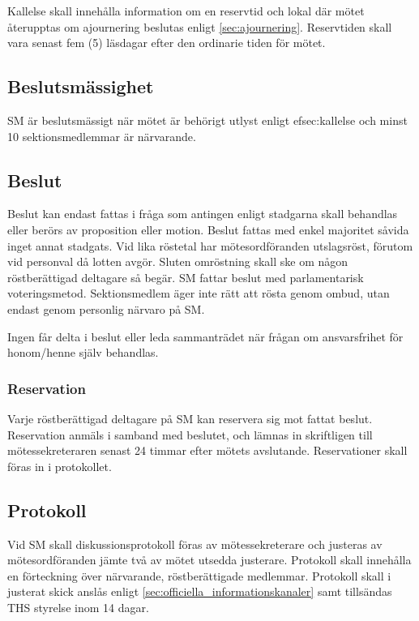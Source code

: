 \documentclass[a4paper,12pt]{article}
\begin{document}
Kallelse skall innehålla information om en reservtid och lokal där mötet återupptas om ajournering beslutas enligt \ref{sec:ajournering}. Reservtiden skall vara senast fem (5) läsdagar efter den ordinarie tiden för mötet.

\subsection{Beslutsmässighet}

SM är beslutsmässigt när mötet är behörigt utlyst enligt 
ef{sec:kallelse} och minst 10 sektionsmedlemmar är närvarande.

\subsection{Beslut}

Beslut kan endast fattas i fråga som antingen enligt stadgarna skall behandlas eller berörs av proposition eller motion. Beslut fattas med enkel majoritet såvida inget annat stadgats. Vid lika röstetal har mötesordföranden utslagsröst, förutom vid personval då lotten avgör. Sluten omröstning skall ske om någon röstberättigad deltagare så begär. SM fattar beslut med parlamentarisk voteringsmetod. Sektionsmedlem äger inte rätt att rösta genom ombud, utan endast genom personlig närvaro på SM.

Ingen får delta i beslut eller leda sammanträdet när frågan om ansvarsfrihet för honom/henne själv behandlas.

\subsubsection{Reservation}

Varje röstberättigad deltagare på SM kan reservera sig mot fattat beslut. Reservation anmäls i samband med beslutet, och lämnas in skriftligen till mötessekreteraren senast 24 timmar efter mötets avslutande. Reservationer skall föras in i protokollet.

\subsection{Protokoll}

Vid SM skall diskussionsprotokoll föras av mötessekreterare och justeras av mötesordföranden jämte två av mötet utsedda justerare. Protokoll skall innehålla en förteckning över närvarande, röstberättigade medlemmar. Protokoll skall i justerat skick anslås enligt \ref{sec:officiella_informationskanaler} samt tillsändas THS styrelse inom 14 dagar.
\end{document}
